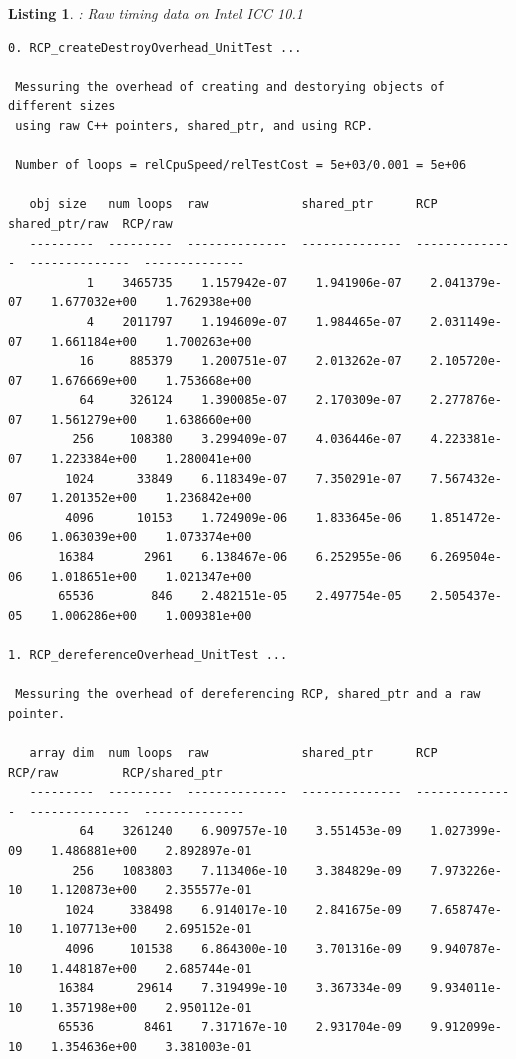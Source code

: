 \documentclass[pdf,ps2pdf,11pt]{SANDreport}
\newtheorem{listing}{Listing}
\begin{document}
\pagebreak

\begin{listing}: Raw {} timing data on Intel ICC 10.1  \\
\label{listing:RCP-ICC-Timings}
{\scriptsize\begin{verbatim}
0. RCP_createDestroyOverhead_UnitTest ... 
 
 Messuring the overhead of creating and destorying objects of different sizes
 using raw C++ pointers, shared_ptr, and using RCP.
 
 Number of loops = relCpuSpeed/relTestCost = 5e+03/0.001 = 5e+06
 
   obj size   num loops  raw             shared_ptr      RCP             shared_ptr/raw  RCP/raw       
   ---------  ---------  --------------  --------------  --------------  --------------  --------------
           1    3465735    1.157942e-07    1.941906e-07    2.041379e-07    1.677032e+00    1.762938e+00
           4    2011797    1.194609e-07    1.984465e-07    2.031149e-07    1.661184e+00    1.700263e+00
          16     885379    1.200751e-07    2.013262e-07    2.105720e-07    1.676669e+00    1.753668e+00
          64     326124    1.390085e-07    2.170309e-07    2.277876e-07    1.561279e+00    1.638660e+00
         256     108380    3.299409e-07    4.036446e-07    4.223381e-07    1.223384e+00    1.280041e+00
        1024      33849    6.118349e-07    7.350291e-07    7.567432e-07    1.201352e+00    1.236842e+00
        4096      10153    1.724909e-06    1.833645e-06    1.851472e-06    1.063039e+00    1.073374e+00
       16384       2961    6.138467e-06    6.252955e-06    6.269504e-06    1.018651e+00    1.021347e+00
       65536        846    2.482151e-05    2.497754e-05    2.505437e-05    1.006286e+00    1.009381e+00

1. RCP_dereferenceOverhead_UnitTest ... 
 
 Messuring the overhead of dereferencing RCP, shared_ptr and a raw pointer.
 
   array dim  num loops  raw             shared_ptr      RCP             RCP/raw         RCP/shared_ptr
   ---------  ---------  --------------  --------------  --------------  --------------  --------------
          64    3261240    6.909757e-10    3.551453e-09    1.027399e-09    1.486881e+00    2.892897e-01
         256    1083803    7.113406e-10    3.384829e-09    7.973226e-10    1.120873e+00    2.355577e-01
        1024     338498    6.914017e-10    2.841675e-09    7.658747e-10    1.107713e+00    2.695152e-01
        4096     101538    6.864300e-10    3.701316e-09    9.940787e-10    1.448187e+00    2.685744e-01
       16384      29614    7.319499e-10    3.367334e-09    9.934011e-10    1.357198e+00    2.950112e-01
       65536       8461    7.317167e-10    2.931704e-09    9.912099e-10    1.354636e+00    3.381003e-01


\end{verbatim}}
\end{listing}
\end{document}
